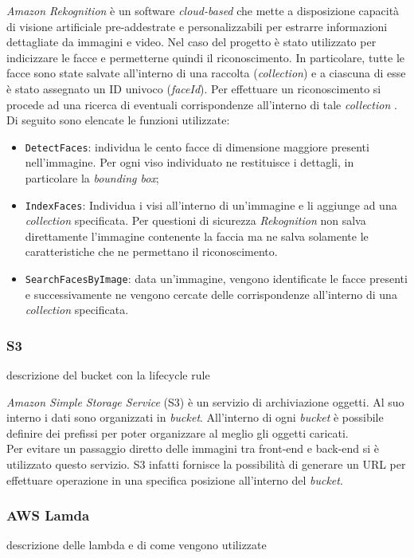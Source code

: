 	\emph{Amazon Rekognition} è un software \emph{cloud-based} che mette a disposizione capacità di visione artificiale pre-addestrate e personalizzabili per estrarre informazioni dettagliate da immagini e video. Nel caso del progetto è stato utilizzato per indicizzare le facce e permetterne quindi il riconoscimento. In particolare, tutte le facce sono state salvate all'interno di una raccolta (\emph{collection}) e a ciascuna di esse è stato assegnato un ID univoco (\emph{faceId}). Per effettuare un riconoscimento si procede ad una ricerca di eventuali corrispondenze all'interno di tale \emph{collection} . \\
	Di seguito sono elencate le funzioni utilizzate:
	\begin{itemize}
		\item \texttt{DetectFaces}: individua le cento facce di dimensione maggiore presenti nell'immagine. Per ogni viso individuato ne restituisce i dettagli, in particolare la \emph{bounding box};
		\item \texttt{IndexFaces}: Individua i visi all'interno di un'immagine e li aggiunge ad una \emph{collection} specificata. Per questioni di sicurezza \emph{Rekognition} non salva direttamente l'immagine contenente la faccia ma ne salva solamente le caratteristiche che ne permettano il riconoscimento.
		\item \texttt{SearchFacesByImage}: data un'immagine, vengono identificate le facce presenti e successivamente ne vengono cercate delle corrispondenze all'interno di una \emph{collection} specificata.
		
	\end{itemize} 
	
	\subsubsection{S3}
	descrizione del bucket con la lifecycle rule
	
	\emph{Amazon Simple Storage Service} (S3) è un servizio di archiviazione oggetti. Al suo interno i dati sono organizzati in \emph{bucket}. All'interno di ogni \emph{bucket} è possibile definire dei prefissi per poter organizzare al meglio gli oggetti caricati. \\ Per evitare un passaggio diretto delle immagini tra front-end e back-end si è utilizzato questo servizio. S3 infatti fornisce la possibilità di generare un URL per effettuare operazione in una specifica posizione all'interno del \emph{bucket}.
	
	\subsubsection{AWS Lamda}
	descrizione delle lambda e di come vengono utilizzate
	
